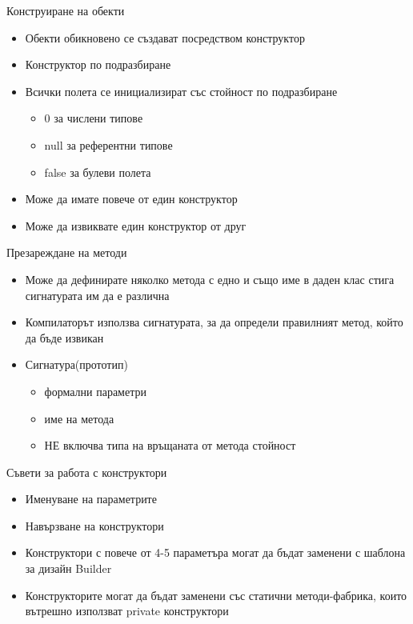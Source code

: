 \documentclass{beamer}
\begin{document}
\begin{frame}{Конструиране на обекти}
  \transdissolve
  \begin{itemize}
  \item Обекти обикновено се създават посредством конструктор
  \item Конструктор по подразбиране
  \item Всички полета се инициализират със стойност по подразбиране
    \begin{itemize}
    \item 0 за числени типове
    \item null за референтни типове
    \item false за булеви полета
    \end{itemize}
  \item Може да имате повече от един конструктор
  \item Може да извиквате един конструктор от друг
  \end{itemize}
\end{frame}

\begin{frame}{Презареждане на методи}
  \transdissolve
  \begin{itemize}
  \item Може да дефинирате няколко метода с едно и също име в даден
    клас стига сигнатурата им да е различна
  \item Компилаторът използва сигнатурата, за да определи правилният
    метод, който да бъде извикан
  \item Сигнатура(прототип)
    \begin{itemize}
    \item формални параметри
    \item име на метода
    \item НЕ включва типа на връщаната от метода стойност
    \end{itemize}
  \end{itemize}
\end{frame}

\begin{frame}{Съвети за работа с конструктори}
  \transdissolve
  \begin{itemize}
  \item Именуване на параметрите
  \item Навързване на конструктори
  \item Конструктори с повече от 4-5 параметъра могат да бъдат
    заменени с шаблона за дизайн Builder
  \item Конструкторите могат да бъдат заменени със статични
    методи-фабрика, които вътрешно използват private конструктори
  \end{itemize}
\end{frame}
\end{document}
